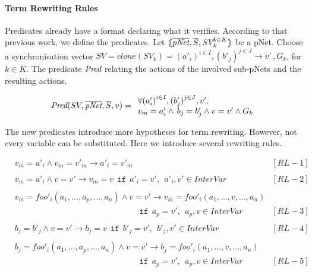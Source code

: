 \documentclass{lncs/llncs}
\newcommand{\QIN}[1]{\textcolor{airforceblue}{#1}}
\newcommand{\Pred}{\symb{Pred}}
\begin{document}
\paragraph{Term Rewriting Rules}
Predicates already have a format declaring what it verifies. According to that previous work, we define the predicates.
Let $\mylangle\overline{\pNet},\overline{S},\symb{SV}_k^{k\in K} \myrangle$
be a pNet. Choose a synchronisation vector $SV=clone(SV_k) ={(a'_i)}^{i\in I}, {(b'_j)}^{j\in J}\rightarrow v' \, ,G_k $, for $k\in K$. The
predicate $\Pred$ relating
the actions of the involved sub-pNets and the resulting actions.
\begin{definition}[Predicate]
\[\Pred(SV, \overline{\pNet},\overline{S}, v) = 
\begin{array}{l}
\forall {(a'_i)}^{i\in I},
{(b'_j)}^{j\in J},v'.
\\
v_m=a'_i\land \, b_j=b'_j \land v=v' \land G_k
\end{array}\]
\end{definition}
\QIN{
The new predicates introduce more hypotheses for term rewriting. However, not every variable can be substituted. 
Here we introduce several rewriting rules.
}

\begin{align*}
   &v_m=a'_i \land v_m=v'_m \rightarrow a'_i = v'_m &[RL-1]\\\\
   &v_m=a'_i \land v=v' \rightarrow v_m=v ~~ \texttt{if} ~~ a'_i = v', ~~ a'_i,v' \in InterVar &[RL-2]\\\\
   &v_m=foo'_i(a_1,...,a_p,...,a_n) \land v=v' \rightarrow v_m=foo'_i(a_1,...,v,...,a_n) \\ 
   &\hspace{15em}\texttt{if} ~~ a_p = v', ~~ a_p,v \in InterVar &[RL-3]\\\\
   &b_j=b'_j \land v=v' \rightarrow b_j=v ~~ \texttt{if} ~~ b'_j = v', ~~ b'_j,v' \in InterVar &[RL-4]\\\\
   &b_j=foo'_i(a_1,...,a_p,...,a_n) \land v=v' \rightarrow b_j=foo'_i(a_1,...,v,...,a_n) \\ 
   &\hspace{15em}\texttt{if} ~~ a_p = v', ~~ a_p,v \in InterVar &[RL-5]\\\\
\end{align*}
\end{document}
